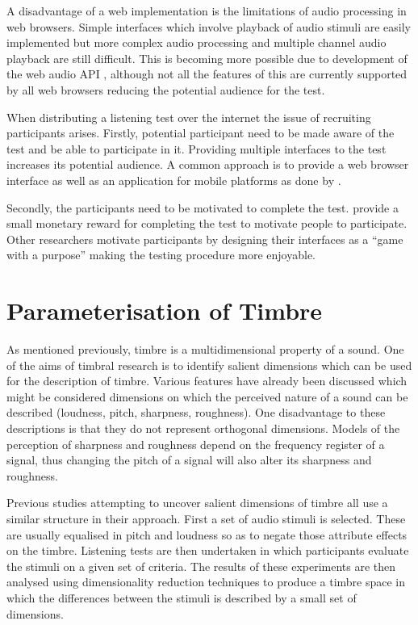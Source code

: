 			A disadvantage of a web implementation is the limitations of audio processing in web browsers.
			Simple interfaces which involve playback of audio stimuli are easily implemented but more complex
			audio processing and multiple channel audio playback are still difficult.  This is becoming more
			possible due to development of the web audio API \citep{adenot2015web}, although not all the
			features of this are currently supported by all web browsers reducing the potential audience for
			the test.

			When distributing a listening test over the internet the issue of recruiting participants arises.
			Firstly, potential participant need to be made aware of the test and be able to participate in it.
			Providing multiple interfaces to the test increases its potential audience. A common approach is to
			provide a web browser interface as well as an application for mobile platforms as done by
			\citet{huq2010crowdsourcing}.

			Secondly, the participants need to be motivated to complete the test.
			\citet{cartwright2013socialeq} provide a small monetary reward for completing the test to motivate
			people to participate. Other researchers motivate participants by designing their interfaces as a
			``game with a purpose'' \citep{law2007tagatune, huq2010crowdsourcing, burgoyne2013hooked} making
			the testing procedure more enjoyable.

\section{Parameterisation of Timbre}
\label{sec:Timbre-Parameterisation}
	As mentioned previously, timbre is a multidimensional property of a sound. One of the aims of timbral research is
	to identify salient dimensions which can be used for the description of timbre. Various features have already been
	discussed which might be considered dimensions on which the perceived nature of a sound can be described (loudness,
	pitch, sharpness, roughness). One disadvantage to these descriptions is that they do not represent orthogonal
	dimensions. Models of the perception of sharpness and roughness depend on the frequency register of a signal, thus
	changing the pitch of a signal will also alter its sharpness and roughness.

	Previous studies attempting to uncover salient dimensions of timbre all use a similar structure in their approach.
	First a set of audio stimuli is selected. These are usually equalised in pitch and loudness so as to negate those
	attribute effects on the timbre. Listening tests are then undertaken in which participants evaluate the stimuli on
	a given set of criteria. The results of these experiments are then analysed using dimensionality reduction
	techniques to produce a timbre space in which the differences between the stimuli is described by a small set of
	dimensions.

